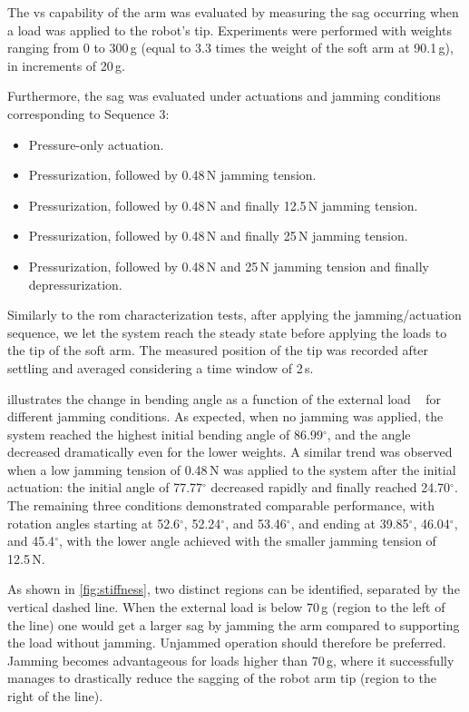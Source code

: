 The \gls{vs} capability of the arm was evaluated by measuring the sag occurring when a load was applied to the robot's tip. Experiments were performed with weights ranging from $0$ to 300\,g (equal to 3.3 times the weight of the soft arm at 90.1\,g), in increments of 20\,g. 

Furthermore, the sag was evaluated under actuations and jamming conditions corresponding to Sequence 3:
\begin{itemize}
    \item Pressure-only actuation.
    \item Pressurization, followed by 0.48\,N jamming tension.
    \item Pressurization, followed by 0.48\,N and finally 12.5\,N jamming tension.
    \item Pressurization, followed by 0.48\,N and finally 25\,N jamming tension.
    \item Pressurization, followed by 0.48\,N and 25\,N jamming tension and finally depressurization.
\end{itemize}
Similarly to the \gls{rom} characterization tests, after applying the jamming/actuation sequence, we let the system reach the steady state before applying the loads to the tip of the soft arm. The measured position of the tip was recorded after settling and averaged considering a time window of 2\,s.

 illustrates the change in bending angle as a function of the external load ~\cite{force-angle1,force-angle2} for different jamming conditions.
As expected, when no jamming was applied, the system reached the highest initial bending angle of 86.99$^{\circ}$, and the angle decreased dramatically even for the lower weights. A similar trend was observed when a low jamming tension of 0.48\,N was applied to the system after the initial actuation: the initial angle of 77.77$^{\circ}$ decreased rapidly and finally reached 24.70$^{\circ}$. The remaining three conditions demonstrated comparable performance, with rotation angles starting at 52.6$^{\circ}$, 52.24$^{\circ}$, and 53.46$^{\circ}$, and ending at 39.85$^{\circ}$, 46.04$^{\circ}$, and 45.4$^{\circ}$, with the lower angle achieved with the smaller jamming tension of 12.5\,N. 

As shown in \cref{fig:stiffness}, two distinct regions can be identified, separated by the vertical dashed line. When the external load is below 70\,g (region to the left of the line) one would get a larger sag by jamming the arm compared to supporting the load without jamming. Unjammed operation should therefore be preferred. Jamming becomes advantageous for loads higher than 70\,g, where it successfully manages to drastically reduce the sagging of the robot arm tip (region to the right of the line). 

